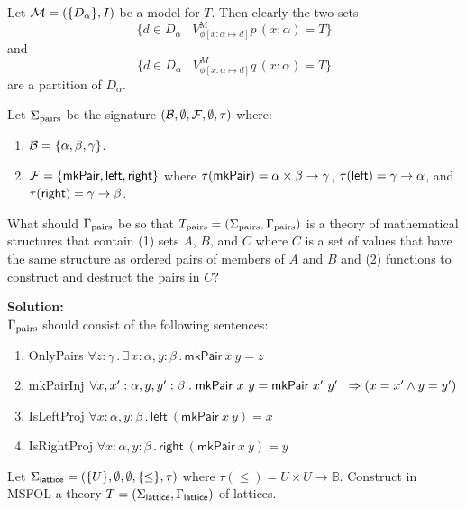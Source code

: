 \documentclass[11pt,fleqn]{article}
\newcommand{\be}{\begin{enumerate}}
\newcommand{\ee}{\end{enumerate}}
\newcommand{\mname}[1]{\mbox{\sf #1}}
\newcommand{\sB}{\mbox{$\cal B$}}
\newcommand{\sF}{\mbox{$\cal F$}}
\newcommand{\sM}{\mbox{$\cal M$}}
\newcommand{\set}[1]{{\{ #1 \}}}
\renewcommand{\And}{\wedge}
\newcommand{\And}{\wedge}
\newcommand{\Implies}{\Rightarrow}
\newcommand{\Forall}{\forall}
\newcommand{\ForsomeApp}{\exists\,}
\newcommand{\mdot}{\mathrel.}
\begin{document}
    Let $\sM = (\set{D_\alpha},I)$ be a model for $T$. Then clearly the
    two sets \[\set{d \in D_\alpha \;|\; V_{\phi[x : \alpha \mapsto
          d]}^{\mbox{M}}p\,(x:\alpha) = T}\] and \[\set{d \in D_\alpha
    \;|\; V_{\phi[x : \alpha \mapsto d]}^{M}q\,(x:\alpha) =
    T}\] are a partition of $D_\alpha$.

  \item Let $\Sigma_{\rm pairs}$ be the signature
    $(\sB,\emptyset,\sF,\emptyset,\tau)$  where:

  \be

    \item $\sB = \set{\alpha,\beta,\gamma}$.

    \item $\sF = \set{\mname{mkPair},\mname{left},\mname{right}}$
      where $\tau(\mname{mkPair}) = \alpha \times \beta \rightarrow
      \gamma$, $\tau(\mname{left}) = \gamma \rightarrow \alpha$, and
      $\tau(\mname{right}) = \gamma \rightarrow \beta$.

  \ee

  What should $\Gamma_{\rm pairs}$ be so that $T_{\rm pairs} =
  (\Sigma_{\rm pairs}, \Gamma_{\rm pairs})$ is a theory of
  mathematical structures that contain (1) sets $A$, $B$, and $C$
  where $C$ is a set of values that have the same structure as ordered
  pairs of members of $A$ and $B$ and (2) functions to construct and
  destruct the pairs in $C$?

\textbf{Solution:}\\
$\Gamma_{\rm pairs}$ should consist of the following sentences:
\be
    \item OnlyPairs   $\Forall z : \gamma \mdot \ForsomeApp x : \alpha , y : \beta \mdot \textsf{mkPair}\ x\ y = z$                                                   
    \item mkPairInj   $\Forall x, x' : \alpha, y, y' : \beta \mdot \textsf{mkPair}\ x\ y = \textsf{mkPair}\ x'\ y' \newline \phantom{x} \Implies (x = x' \And y = y')$ 
     \item IsLeftProj  $\Forall x : \alpha, y : \beta \mdot \textsf{left}\ (\textsf{mkPair}\ x\ y) = x$                                                                
     \item IsRightProj $\Forall x : \alpha, y : \beta \mdot \textsf{right}\ (\textsf{mkPair}\ x\ y) = y$
\ee

  \item Let $\Sigma_{\sf lattice} =
    (\set{U},\emptyset,\emptyset,\set{\le}, \tau)$ where $\tau(\le) =
    U \times U \rightarrow \mathbb{B}$.  Construct in MSFOL a theory
    $T=(\Sigma_{\sf lattice},\Gamma_{\sf lattice})$ of lattices.
\end{document}
